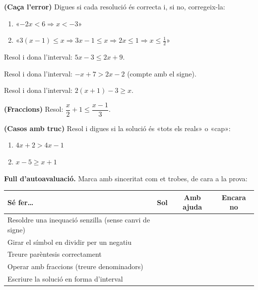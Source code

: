 \begin{exercicis}
\begin{exlist}
  \item \textbf{(Caça l'error)} Digues si cada resolució és correcta i, si no, corregeix-la:
        \begin{enumerate}[label=\alph*), leftmargin=1.6em, topsep=2pt]
          \item «$-2x<6 \Rightarrow x<-3$»
          \item «$3(x-1)\le x \Rightarrow 3x-1\le x \Rightarrow 2x\le 1 \Rightarrow x\le \tfrac{1}{2}$»
        \end{enumerate}
  \item Resol i dona l'interval: $5x-3\le 2x+9$.
  \item Resol i dona l'interval: $-x+7>2x-2$ \quad (compte amb el signe).
  \item Resol i dona l'interval: $2(x+1)-3\ge x$.
  \item \textbf{(Fraccions)} Resol: $\dfrac{x}{2}+1\le \dfrac{x-1}{3}$.
  \item \textbf{(Casos amb truc)} Resol i digues si la solució és «tots els reals» o
        «cap»:
        \begin{enumerate}[label=\alph*), leftmargin=1.6em, topsep=2pt]
          \item $4x+2>4x-1$
          \item $x-5\ge x+1$
        \end{enumerate}
\end{exlist}
\end{exercicis}

\begin{idea}
\textbf{Full d'autoavaluació.} Marca amb sinceritat com et trobes, de cara a la prova:
\begin{center}
\renewcommand{\arraystretch}{1.4}
\begin{tabular}{p{8cm} c c c}
\toprule
\textbf{Sé fer\dots} & \textbf{Sol} & \textbf{Amb ajuda} & \textbf{Encara no} \\
\midrule
Resoldre una inequació senzilla (sense canvi de signe) & & & \\
Girar el símbol en dividir per un negatiu & & & \\
Treure parèntesis correctament & & & \\
Operar amb fraccions (treure denominadors) & & & \\
Escriure la solució en forma d'interval & & & \\
\bottomrule
\end{tabular}
\end{center}
\end{idea}

